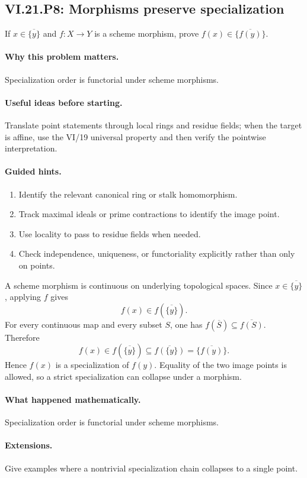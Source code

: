 \subsection*{VI.21.P8: Morphisms preserve specialization}
\begin{problem}\label{prob:vi21-p08}
If $x\in\overline{\{y\}}$ and $f:X\to Y$ is a scheme morphism, prove
$f(x)\in\overline{\{f(y)\}}$.
\end{problem}

\ifdefined\FullProblemDossiers
\paragraph{Why this problem matters.}
Specialization order is functorial under scheme morphisms.

\paragraph{Useful ideas before starting.}
Translate point statements through local rings and residue fields; when the target is affine, use the VI/19 universal property and then verify the pointwise interpretation.

\paragraph{Guided hints.}
\begin{enumerate}
\item Identify the relevant canonical ring or stalk homomorphism.
\item Track maximal ideals or prime contractions to identify the image point.
\item Use locality to pass to residue fields when needed.
\item Check independence, uniqueness, or functoriality explicitly rather than only on points.
\end{enumerate}

\begin{solution}
A scheme morphism is continuous on underlying topological spaces.  Since
$x\in\overline{\{y\}}$, applying $f$ gives
\[
f(x)\in f(\overline{\{y\}}).
\]
For every continuous map and every subset $S$, one has
$f(\overline S)\subseteq\overline{f(S)}$.  Therefore
\[
f(x)\in f(\overline{\{y\}})
\subseteq\overline{f(\{y\})}
=\overline{\{f(y)\}}.
\]
Hence $f(x)$ is a specialization of $f(y)$.  Equality of the two image points is allowed, so a
strict specialization can collapse under a morphism.
\end{solution}

\paragraph{What happened mathematically.}
Specialization order is functorial under scheme morphisms.

\paragraph{Extensions.}
Give examples where a nontrivial specialization chain collapses to a single point.
\fi
